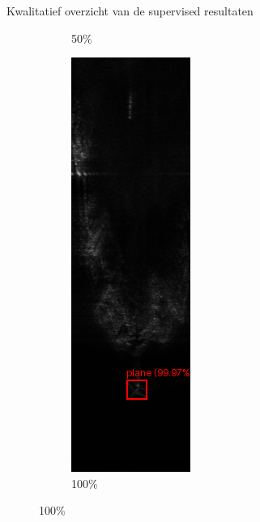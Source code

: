 \documentclass[aspectratio=169]{beamer}
\begin{document}
\begin{frame}{Kwalitatief overzicht van de supervised resultaten}
\begin{figure}
\begin{subfigure}{.15\textwidth}
                \caption[Voorspelling Faster R-CNN 50\%]{50\%}
            \end{subfigure}%
            \hfill
            \begin{subfigure}{.15\textwidth}
                \centering
                \captionsetup{justification=centering}
                \includegraphics[width=0.9\linewidth]{251_faster_rcnn_100pct.png}
                \caption[Voorspelling Faster R-CNN 100\%]{100\%}
            \end{subfigure}%
        \end{figure}
    \end{frame}
    
\end{document}
